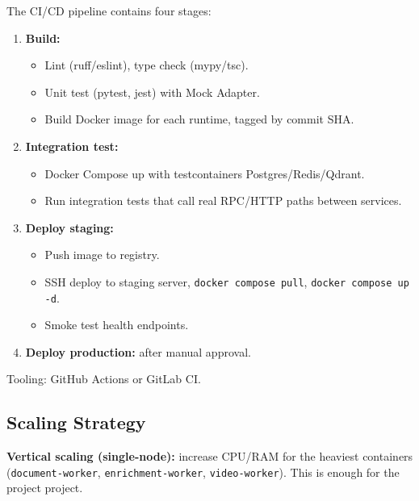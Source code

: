 The CI/CD pipeline contains four stages:

\begin{enumerate}
    \item \textbf{Build:}
        \begin{itemize}
            \item Lint (ruff/eslint), type check (mypy/tsc).
            \item Unit test (pytest, jest) with Mock Adapter.
            \item Build Docker image for each runtime, tagged by commit
                  SHA.
        \end{itemize}
    \item \textbf{Integration test:}
        \begin{itemize}
            \item Docker Compose up with testcontainers
                  Postgres/Redis/Qdrant.
            \item Run integration tests that call real RPC/HTTP paths
                  between services.
        \end{itemize}
    \item \textbf{Deploy staging:}
        \begin{itemize}
            \item Push image to registry.
            \item SSH deploy to staging server, \texttt{docker compose
                  pull}, \texttt{docker compose up -d}.
            \item Smoke test health endpoints.
        \end{itemize}
    \item \textbf{Deploy production:} after manual approval.
\end{enumerate}

Tooling: GitHub Actions or GitLab CI.

\subsection{Scaling Strategy}

\textbf{Vertical scaling (single-node):} increase CPU/RAM for the heaviest
containers (\texttt{document-worker}, \texttt{enrichment-worker},
\texttt{video-worker}). This is enough for the project project.

